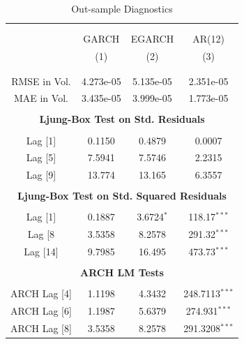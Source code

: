 \documentclass[a4paper]{article}
\begin{document}
\begin{table}[H] \centering 
  \caption{Out-sample Diagnostics} 
  \label{tab:diagnostic-out-ar} %
\begin{tabular}{@{\extracolsep{4pt}}cccc} 
\\[-1.8ex]\hline 
\hline \\[-1.8ex] 
 
\\[-1.8ex] & GARCH & EGARCH & AR(12) \\ 
& (1) & (2) & (3)  \\ 

\\[-1.8ex]\hline
\\[-1.8ex] RMSE in Vol. & 4.273e-05 & 5.135e-05 & 2.351e-05 \\ 
MAE in Vol. & 3.435e-05 & 3.999e-05 & 1.773e-05 \\ 
\hline \\[-1.8ex]

\multicolumn{4}{c}{\textbf{Ljung-Box Test on Std. Residuals}}\\
\hline \\[-1.8ex] 
Lag [1] & 0.1150 & 0.4879 & 0.0007 \\ 
Lag [5] & 7.5941 & 7.5746 & 2.2315 \\ 
Lag [9] & 13.774 & 13.165 & 6.3557 \\  
\hline \\[-1.8ex] 

\multicolumn{4}{c}{\textbf{Ljung-Box Test on Std. Squared Residuals}}\\
\hline \\[-1.8ex] 
Lag [1] & 0.1887 & 3.6724$^{*}$ & 118.17$^{***}$  \\ 
Lag [8 & 3.5358 & 8.2578 & 291.32$^{***}$ \\ 
Lag [14] & 9.7985 & 16.495 & 473.73$^{***}$ \\
\hline \\[-1.8ex]

\multicolumn{4}{c}{\textbf{ARCH LM Tests}}\\
\hline \\[-1.8ex] 
ARCH Lag [4] & 1.1198 & 4.3432 & 248.7113$^{***}$ \\ 
ARCH Lag [6] & 1.1987 & 5.6379 & 274.931$^{***}$ \\ 
ARCH Lag [8] & 3.5358 & 8.2578 & 291.3208$^{***}$ \\

\hline 
\end{tabular} 
\end{table} 
\end{document}
